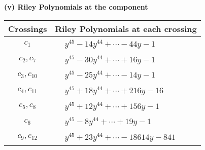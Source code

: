 \documentclass[1p]{elsarticle_modified}
\theoremstyle{definition}
\begin{document}
\newpage\renewcommand{\arraystretch}{1}
\flushleft \textbf{(v) Riley Polynomials at the component}\newline \\
\begin{tabular}{m{50pt}|m{274pt}}
Crossings & \hspace{64pt}Riley Polynomials at each crossing \\
\hline $$\begin{aligned}c_{1}\end{aligned}$$&$\begin{aligned}
&y^{45}-14 y^{44}+\cdots-44 y-1
\end{aligned}$\\
\hline $$\begin{aligned}c_{2},c_{7}\end{aligned}$$&$\begin{aligned}
&y^{45}-30 y^{44}+\cdots+16 y-1
\end{aligned}$\\
\hline $$\begin{aligned}c_{3},c_{10}\end{aligned}$$&$\begin{aligned}
&y^{45}-25 y^{44}+\cdots-14 y-1
\end{aligned}$\\
\hline $$\begin{aligned}c_{4},c_{11}\end{aligned}$$&$\begin{aligned}
&y^{45}+18 y^{44}+\cdots+216 y-16
\end{aligned}$\\
\hline $$\begin{aligned}c_{5},c_{8}\end{aligned}$$&$\begin{aligned}
&y^{45}+12 y^{44}+\cdots+156 y-1
\end{aligned}$\\
\hline $$\begin{aligned}c_{6}\end{aligned}$$&$\begin{aligned}
&y^{45}-8 y^{44}+\cdots+19 y-1
\end{aligned}$\\
\hline $$\begin{aligned}c_{9},c_{12}\end{aligned}$$&$\begin{aligned}
&y^{45}+23 y^{44}+\cdots-18614 y-841
\end{aligned}$\\
\hline
\end{tabular}\\~\\
\end{document}
